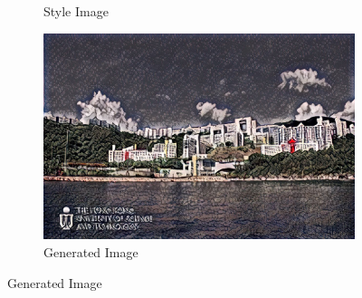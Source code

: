 \documentclass{article}
\begin{document}
\begin{figure}[h!]
\begin{minipage}{\textwidth}
\begin{subfigure}{0.25\textwidth}
            \caption{Style Image}
        \end{subfigure}
        \hfill %
        \begin{subfigure}{0.25\textwidth}
            \includegraphics[width=\textwidth]{./part1_inference/output_6_boris-kustodiev_under-honey-s-harmonica-1927.jpg}
            \caption{Generated Image}
        \end{subfigure}
    \end{minipage}
    
    \vspace{0.1cm}


\end{figure}
\end{document}
